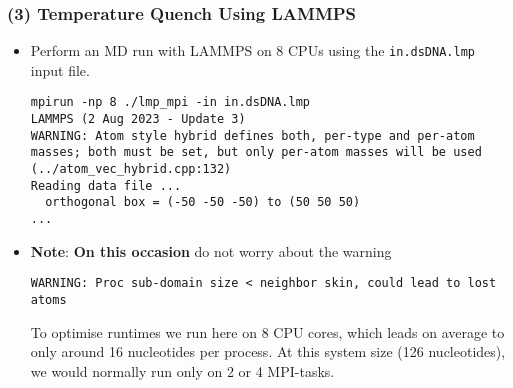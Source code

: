 \documentclass[slidestop,compress,9pt]{beamer}
\begin{document}
\begin{frame}[fragile]
\frametitle{(3) Temperature Quench Using LAMMPS}

\begin{itemize}
\item Perform an MD run with LAMMPS on 8 CPUs using the \texttt{in.dsDNA.lmp} input file.
\begin{lstlisting}
mpirun -np 8 ./lmp_mpi -in in.dsDNA.lmp 
LAMMPS (2 Aug 2023 - Update 3)
WARNING: Atom style hybrid defines both, per-type and per-atom masses; both must be set, but only per-atom masses will be used (../atom_vec_hybrid.cpp:132)
Reading data file ...
  orthogonal box = (-50 -50 -50) to (50 50 50)
...
\end{lstlisting}
\item \textbf{Note}: \textbf{On this occasion} do not worry about the warning
\begin{lstlisting}
WARNING: Proc sub-domain size < neighbor skin, could lead to lost atoms
\end{lstlisting}
To optimise runtimes we run here on 8 CPU cores, which leads on average to only around 16 nucleotides per process. At this system size (126 nucleotides), we would normally run only on 2 or 4 MPI-tasks.
\end{itemize}

\end{frame}
\end{document}
